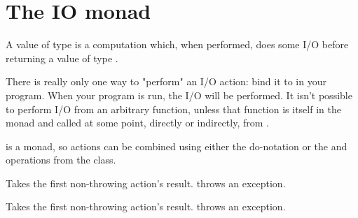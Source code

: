 \section{The IO monad}
\begin{haddockdesc}
\item[\begin{tabular}{@{}l}
data IO a
\end{tabular}]
{\haddockbegindoc
A value of type  is a computation which, when performed,
does some I/O before returning a value of type .\par
There is really only one way to "perform" an I/O action: bind it to
 in your program.  When your program is run, the I/O will
be performed.  It isn't possible to perform I/O from an arbitrary
function, unless that function is itself in the  monad and called
at some point, directly or indirectly, from .\par
{} is a monad, so  actions can be combined using either the do-notation
or the \haddockid{>>} and \haddockid{>>=} operations from the 
class.\par}
\end{haddockdesc}
\begin{haddockdesc}
\item[\begin{tabular}{@{}l}
\end{tabular}]
\end{haddockdesc}
\begin{haddockdesc}
\item[\begin{tabular}{@{}l}
\end{tabular}]
{\haddockbegindoc
Takes the first non-throwing  action's result.
  throws an exception.\par}
\end{haddockdesc}
\begin{haddockdesc}
\item[\begin{tabular}{@{}l}
instance Functor IO\\instance Monad IO
\end{tabular}]
\end{haddockdesc}
\begin{haddockdesc}
\item[\begin{tabular}{@{}l}
instance MonadPlus IO
\end{tabular}]
{\haddockbegindoc
Takes the first non-throwing  action's result.
  throws an exception.\par}
\end{haddockdesc}
